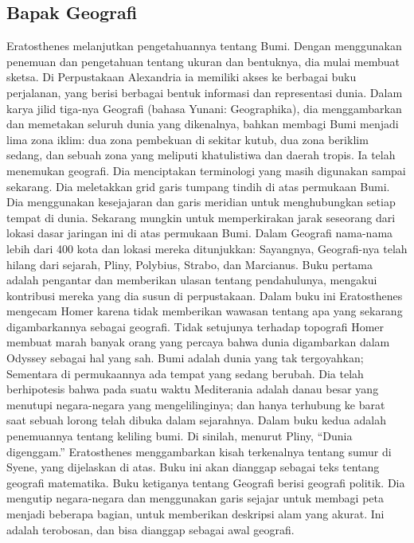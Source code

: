 \subsection{Bapak Geografi}
Eratosthenes melanjutkan pengetahuannya tentang Bumi. Dengan menggunakan penemuan dan pengetahuan tentang ukuran dan bentuknya, dia mulai membuat sketsa. Di Perpustakaan Alexandria ia memiliki akses ke berbagai buku perjalanan, yang berisi berbagai bentuk informasi dan representasi dunia. \cite{smith2005dictionary} Dalam karya jilid tiga-nya Geografi (bahasa Yunani: Geographika), dia menggambarkan dan memetakan seluruh dunia yang dikenalnya, bahkan membagi Bumi menjadi lima zona iklim: \cite{grimbly2013encyclopedia} dua zona pembekuan di sekitar kutub, dua zona beriklim sedang, dan sebuah zona yang meliputi khatulistiwa dan daerah tropis. Ia telah menemukan geografi. Dia menciptakan terminologi yang masih digunakan sampai sekarang. Dia meletakkan grid garis tumpang tindih di atas permukaan Bumi. Dia menggunakan kesejajaran dan garis meridian untuk menghubungkan setiap tempat di dunia. Sekarang mungkin untuk memperkirakan jarak seseorang dari lokasi dasar jaringan ini di atas permukaan Bumi. Dalam Geografi nama-nama lebih dari 400 kota dan lokasi mereka ditunjukkan:  Sayangnya, Geografi-nya telah hilang dari sejarah, Pliny, Polybius, Strabo, dan Marcianus. \cite{roller2010eratosthenes}
Buku pertama adalah pengantar dan memberikan ulasan tentang pendahulunya, mengakui kontribusi mereka yang dia susun di perpustakaan. Dalam buku ini Eratosthenes mengecam Homer karena tidak memberikan wawasan tentang apa yang sekarang digambarkannya sebagai geografi. Tidak setujunya terhadap topografi Homer membuat marah banyak orang yang percaya bahwa dunia digambarkan dalam Odyssey sebagai hal yang sah. \cite{eckerman2011eratosthenes} Bumi adalah dunia yang tak tergoyahkan; Sementara di permukaannya ada tempat yang sedang berubah. Dia telah berhipotesis bahwa pada suatu waktu Mediterania adalah danau besar yang menutupi negara-negara yang mengelilinginya; dan hanya terhubung ke barat saat sebuah lorong telah dibuka dalam sejarahnya.
Dalam buku kedua adalah penemuannya tentang keliling bumi. Di sinilah, menurut Pliny, ``Dunia digenggam.'' Eratosthenes menggambarkan kisah terkenalnya tentang sumur di Syene, yang dijelaskan di atas. Buku ini akan dianggap sebagai teks tentang geografi matematika.
Buku ketiganya tentang Geografi berisi geografi politik. Dia mengutip negara-negara dan menggunakan garis sejajar untuk membagi peta menjadi beberapa bagian, untuk memberikan deskripsi alam yang akurat. Ini adalah terobosan, dan bisa dianggap sebagai awal geografi. \cite{smith2005dictionary}

